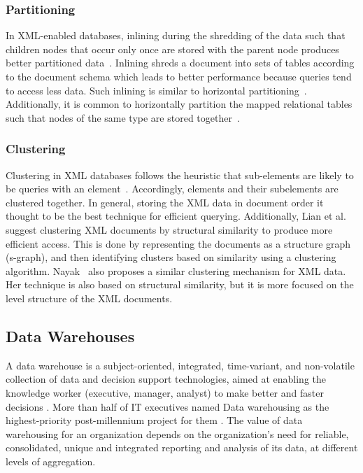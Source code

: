 \documentclass[12pt,a4paper]{article}
\begin{document}
\subsubsection{Partitioning}
In XML-enabled databases, inlining during the shredding of the data such that children nodes that occur only once are stored with the parent node produces
better partitioned data~\cite{tatarinov2002storing}. Inlining shreds a document into sets of tables according to the document schema which leads to better
performance because queries tend to access less data. Such inlining is similar to horizontal partitioning~\cite{ramanath2003searching}. Additionally, it is
common to horizontally partition the mapped relational tables such that nodes of the same type are stored together~\cite{amer2002overview}.

\subsubsection{Clustering}
Clustering in XML databases follows the heuristic that sub-elements are likely to be queries with an element~\cite{jagadish2002timber}. Accordingly, elements
and their subelements are clustered together. In general, storing the XML data in document order it thought to be the best technique for efficient querying.
Additionally, Lian et al.~\cite{lian2004efficient} suggest clustering XML documents by structural similarity to produce more efficient access. This is done by
representing the documents as a structure graph (s-graph), and then identifying clusters based on similarity using a clustering algorithm.
Nayak~\cite{nayak2008fast} also proposes a similar clustering mechanism for XML data. Her technique is also based on structural similarity, but it is more
focused on the level structure of the XML documents.


\subsection{Data Warehouses}
\label{SEC-WAREHOUSES}
A data warehouse is a subject-oriented, integrated, time-variant, and non-volatile collection of data and decision support technologies, aimed at enabling the
knowledge worker (executive, manager, analyst) to make better and faster decisions \cite{560407, chaudhuri1997overview}. More than half of IT executives named
Data warehousing as the highest-priority post-millennium project for them \cite{sen2005comparison}. The value of data warehousing for an organization depends on
the organization's need for reliable, consolidated, unique and integrated reporting and analysis of its data, at different levels of aggregation.
\end{document}
